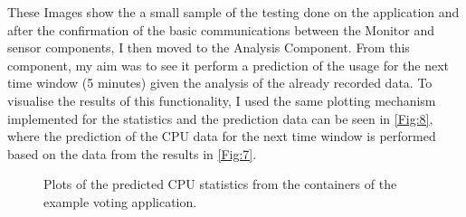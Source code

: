 These Images show the a small sample of the testing done on the application and after the confirmation of the basic communications between the Monitor and sensor components, I then moved to the Analysis Component. From this component, my aim was to see it perform a prediction of the usage for the next time window (5 minutes) given the analysis of the already recorded data. To visualise the results of this functionality, I used the same plotting mechanism implemented for the statistics and the prediction data can be seen in \autoref{Fig:8}, where the prediction of the CPU data for the next time window is performed based on the data from the results in \autoref{Fig:7}.
\begin{figure}[H]
\centering
  \hfill
  \hfill   
    \hfill
  \hfill
    \caption{Plots of the predicted CPU statistics from the containers of the example voting application.} 
   \label{Fig:8} 
\end{figure}

